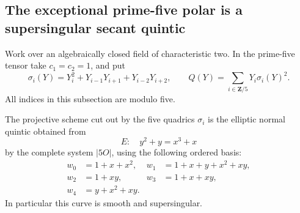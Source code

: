 \subsection{The exceptional prime-five polar is a supersingular secant quintic}

Work over an algebraically closed field of characteristic two. In the
prime-five tensor take \(c_1=c_2=1\), and put
\[
 \sigma_i(Y)=Y_i^2+Y_{i-1}Y_{i+1}+Y_{i-2}Y_{i+2},\qquad
 Q(Y)=\sum_{i\in\mathbf Z/5}Y_i\sigma_i(Y)^2.
 \tag{SQ5.1}
\]
All indices in this subsection are modulo five.

\begin{lemma}
\label{lem:prime-five-supersingular-Pfaffian-curve}
The projective scheme cut out by the five quadrics \(\sigma_i\)
is the elliptic normal quintic obtained from
\[
                     E:\quad y^2+y=x^3+x
 \tag{SQ5.2}
\]
by the complete system \(|5O|\), using the following ordered basis:
\[
 \begin{split}
 w_0&=1+x+x^2,&w_1&=1+x+y+x^2+xy,\\
 w_2&=1+xy,&w_3&=1+x+xy,\\
 w_4&=y+x^2+xy.
 \end{split}                                      \tag{SQ5.3}
\]
In particular this curve is smooth and supersingular.
\end{lemma}
